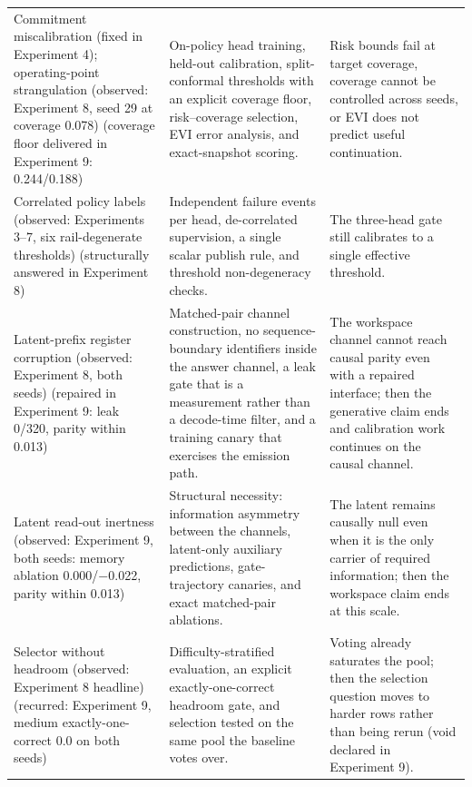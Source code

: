 \documentclass[10pt,a4paper]{article}
\newcommand{\fail}[1]{\textcolor{failred}{#1}}
\newcommand{\good}[1]{\textcolor{okgreen}{#1}}
\begin{document}
\begin{table}[htbp]
\begin{tabularx}{\textwidth}{@{}>{\raggedright\arraybackslash}p{}XX@{}}
Commitment miscalibration \good{(fixed in Experiment 4)}; operating-point strangulation \fail{(observed: Experiment 8, seed 29 at coverage 0.078)} \good{(coverage floor delivered in Experiment 9: 0.244/0.188)} & On-policy head training, held-out calibration, split-conformal thresholds with an explicit coverage floor, risk--coverage selection, EVI error analysis, and exact-snapshot scoring. & Risk bounds fail at target coverage, coverage cannot be controlled across seeds, or EVI does not predict useful continuation. \\
Correlated policy labels \fail{(observed: Experiments 3--7, six rail-degenerate thresholds)} \good{(structurally answered in Experiment 8)} & Independent failure events per head, de-correlated supervision, a single scalar publish rule, and threshold non-degeneracy checks. & The three-head gate still calibrates to a single effective threshold. \\
Latent-prefix register corruption \fail{(observed: Experiment 8, both seeds)} \good{(repaired in Experiment 9: leak 0/320, parity within 0.013)} & Matched-pair channel construction, no sequence-boundary identifiers inside the answer channel, a leak gate that is a measurement rather than a decode-time filter, and a training canary that exercises the emission path. & The workspace channel cannot reach causal parity even with a repaired interface; then the generative claim ends and calibration work continues on the causal channel. \\
Latent read-out inertness \fail{(observed: Experiment 9, both seeds: memory ablation 0.000/$-$0.022, parity within 0.013)} & Structural necessity: information asymmetry between the channels, latent-only auxiliary predictions, gate-trajectory canaries, and exact matched-pair ablations. & The latent remains causally null even when it is the only carrier of required information; then the workspace claim ends at this scale. \\
Selector without headroom \fail{(observed: Experiment 8 headline)} \fail{(recurred: Experiment 9, medium exactly-one-correct 0.0 on both seeds)} & Difficulty-stratified evaluation, an explicit exactly-one-correct headroom gate, and selection tested on the same pool the baseline votes over. & Voting already saturates the pool; then the selection question moves to harder rows rather than being rerun \fail{(void declared in Experiment 9)}. \\
\bottomrule
\end{tabularx}
\end{table}
\end{document}
